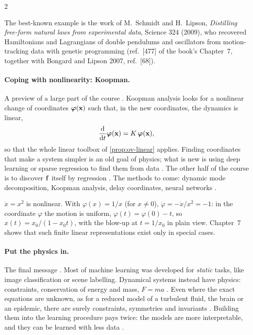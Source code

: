 \begin{paracol}{2}
\begin{aside}
The best-known example is the work of M.~Schmidt and H.~Lipson, \emph{Distilling free-form natural
laws from experimental data}, Science 324 (2009), who recovered Hamiltonians and Lagrangians of
double pendulums and oscillators from motion-tracking data with genetic programming (ref.~[477] of
the book's Chapter~7, together with Bongard and Lipson 2007, ref.~[68]).
\end{aside}

\paragraph{Coping with nonlinearity: Koopman.} A preview of a large part of the course
. Koopman analysis looks for a nonlinear change of coordinates $\boldsymbol\varphi(\mathbf{x})$
such that, in the new coordinates, the dynamics is linear,
\[
  \frac{\mathrm d}{\mathrm dt}\boldsymbol\varphi(\mathbf{x}) = K\,\boldsymbol\varphi(\mathbf{x}),
\]
so that the whole linear toolbox of \cref{prop:ov-linear} applies. Finding coordinates that make a
system simpler is an old goal of physics; what is new is using deep learning or sparse regression to
find them from data . The other half of the course is to discover $\mathbf{f}$
itself by regression . The methods to come: dynamic mode decomposition, Koopman
analysis, delay coordinates, neural networks .

\begin{example}
$\dot x=x^2$ is nonlinear. With $\varphi(x)=1/x$ (for $x\neq0$), $\dot\varphi=-\dot x/x^2=-1$: in
the coordinate $\varphi$ the motion is uniform, $\varphi(t)=\varphi(0)-t$, so
$x(t)=x_0/(1-x_0t)$, with the blow-up at $t=1/x_0$ in plain view. Chapter~7 shows that such
finite linear representations exist only in special cases.
\end{example}

\paragraph{Put the physics in.} The final message . Most of machine learning was
developed for \emph{static} tasks, like image classification or scene labelling. Dynamical systems
instead have physics: constraints, conservation of energy and mass, $F=ma$
. Even where the exact equations are unknown, as for a reduced model of a turbulent
fluid, the brain or an epidemic, there are surely constraints, symmetries and invariants
. Building them into the learning procedure pays twice: the models are
more interpretable, and they can be learned with less data .


\end{paracol}

